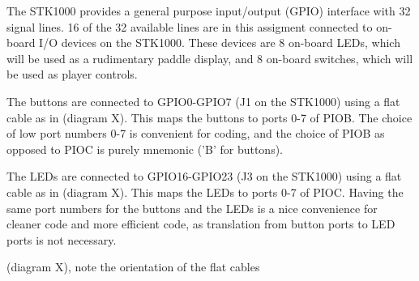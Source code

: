 The STK1000 provides a general purpose input/output (GPIO) interface with 32 signal lines.
16 of the 32 available lines are in this assigment connected to on-board I/O devices on the STK1000.
These devices are 8 on-board LEDs, which will be used as a rudimentary paddle display, and 8 on-board switches, which will be used as player controls.

The buttons are connected to GPIO0-GPIO7 (J1 on the STK1000) using a flat cable as in (diagram X). This maps the buttons to ports 0-7 of PIOB.
The choice of low port numbers 0-7 is convenient for coding, and the choice of PIOB as opposed to PIOC is purely mnemonic ('B' for buttons).

The LEDs are connected to GPIO16-GPIO23 (J3 on the STK1000) using a flat cable as in (diagram X). This maps the LEDs to ports 0-7 of PIOC.
Having the same port numbers for the buttons and the LEDs is a nice convenience for cleaner code and more efficient code, as translation from button ports to LED ports is not necessary.

(diagram X), note the orientation of the flat cables

